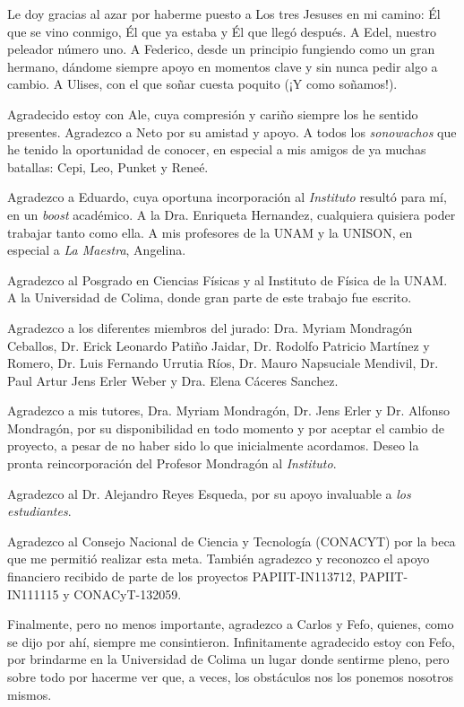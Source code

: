 \documentclass[12pt, letter, twoside]{Thesis} %
\begin{document}
{{Le doy gracias al azar por haberme puesto a  Los tres Jesuses en mi camino: Él que se vino conmigo, Él que ya estaba y Él que llegó después. A Edel, nuestro peleador número uno. A Federico, desde un principio fungiendo como un gran hermano, dándome  siempre apoyo en momentos clave y sin nunca pedir algo a cambio. A Ulises, con el que soñar cuesta poquito (¡Y como soñamos!).

 Agradecido estoy con Ale, cuya compresión y cariño siempre los he sentido presentes. Agradezco a Neto por su amistad y apoyo. A  todos los \textit{sonowachos} que he tenido la oportunidad de conocer, en especial a mis amigos de ya muchas  batallas: Cepi, Leo, Punket y Reneé.

 Agradezco a  Eduardo, cuya  oportuna incorporación al \textit{Instituto} resultó para mí, en un \textit{boost} académico. A la Dra. Enriqueta Hernandez, cualquiera quisiera poder trabajar tanto como ella. A mis profesores de la UNAM y la UNISON, en especial a \textit{La Maestra}, Angelina.

Agradezco al Posgrado en Ciencias Físicas y al Instituto de Física  de la UNAM. A la  Universidad de Colima,  donde  gran parte de este trabajo  fue escrito.


Agradezco a los diferentes miembros del jurado:
Dra. Myriam Mondragón Ceballos, Dr. Erick Leonardo Pati\~no Jaidar, Dr. Rodolfo Patricio Martínez y Romero, Dr. Luis Fernando Urrutia Ríos, Dr. Mauro Napsuciale Mendivil, Dr. Paul Artur Jens Erler  Weber y Dra. Elena Cáceres Sanchez.


Agradezco a mis tutores,  Dra.  Myriam Mondragón,  Dr.  Jens Erler y  Dr. Alfonso Mondragón, por su disponibilidad en todo  momento y por aceptar el cambio de proyecto, a pesar de no haber sido lo que inicialmente acordamos. Deseo  la pronta  reincorporación del Profesor Mondragón al \textit{Instituto}.

Agradezco al Dr. Alejandro Reyes Esqueda, por su apoyo invaluable a \textit{los estudiantes}.

Agradezco al Consejo Nacional de Ciencia y Tecnología (CONACYT) por la
beca que me permitió realizar esta meta. También agradezco y reconozco el
apoyo financiero recibido de parte de los proyectos PAPIIT-IN113712, PAPIIT-IN111115 y CONACyT-132059.

 Finalmente, pero no menos importante, agradezco  a Carlos y Fefo, quienes, como se dijo por ahí, siempre me consintieron.  Infinitamente agradecido estoy con Fefo, por brindarme en la Universidad de Colima un lugar donde sentirme pleno, pero sobre todo  por hacerme ver que, a veces, los obstáculos nos los ponemos nosotros mismos.
 
}}
\end{document}
